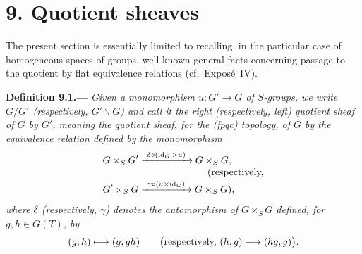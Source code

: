 
\section*{9. Quotient sheaves}
\label{sec:sga3-VIB-9}%

The present section is essentially limited to recalling, in the
particular case of homogeneous spaces of groups, well-known general
facts concerning passage to the quotient by flat equivalence relations
(cf.\ Expos\'e~IV).

\medskip
{}\label{def:sga3-VIB-9.1}%
\noindent\textbf{Definition 9.1.---}
\emph{Given a monomorphism \(u:G'\to G\) of \(S\)-groups, we
write \(G/G'\) \textup{(respectively, \(G'\backslash G\))} and call it
the \textup{right \textup{(respectively, left)} quotient sheaf of
\(G\) by \(G'\)}, meaning the quotient sheaf, for the
\textup{(fpqc)} topology, of \(G\) by the equivalence relation defined
by the monomorphism}
\label{form:sga3-VIB-9.1-equivalence-relations}%
\[
\begin{aligned}
  G\times_S G'
    &\xrightarrow{\ \delta\circ(\operatorname{id}_G\times u)\ }
      G\times_S G,\\[-1mm]
  &\hspace{7em}\textup{\emph{\textup{(respectively,}}}\\[-1mm]
  G'\times_S G
    &\xrightarrow{\ \gamma\circ(u\times\operatorname{id}_G)\ }
      G\times_S G\textup{\emph{\textup{),}}}
\end{aligned}
\]
\emph{where \(\delta\) \textup{(respectively, \(\gamma\))} denotes
the automorphism of \(G\times_SG\) defined, for
\(g,h\in G(T)\), by}
\[
  (g,h)\longmapsto(g,gh)
  \qquad
  \bigl(\textup{respectively, }(h,g)\longmapsto(hg,g)\bigr).
\]

